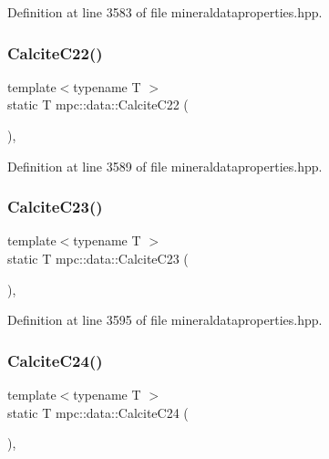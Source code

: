 Definition at line 3583 of file mineraldataproperties.\+hpp.

\mbox{\label{namespacempc_1_1data_a8a6080282f5e9ee5ef7fd6797cf137f4}} 
\subsubsection{\texorpdfstring{Calcite\+C22()}{CalciteC22()}}
{\footnotesize\ttfamily template$<$typename T $>$ \\
static T mpc\+::data\+::\+Calcite\+C22 (\begin{DoxyParamCaption}{ }\end{DoxyParamCaption})\hspace{0.3cm}{\ttfamily [inline]}, {\ttfamily [static]}}



Definition at line 3589 of file mineraldataproperties.\+hpp.

\mbox{\label{namespacempc_1_1data_a235390ea020759b17d1277dd49abf30b}} 
\subsubsection{\texorpdfstring{Calcite\+C23()}{CalciteC23()}}
{\footnotesize\ttfamily template$<$typename T $>$ \\
static T mpc\+::data\+::\+Calcite\+C23 (\begin{DoxyParamCaption}{ }\end{DoxyParamCaption})\hspace{0.3cm}{\ttfamily [inline]}, {\ttfamily [static]}}



Definition at line 3595 of file mineraldataproperties.\+hpp.

\mbox{\label{namespacempc_1_1data_a3e353500a1f0d816709880721b6204de}} 
\subsubsection{\texorpdfstring{Calcite\+C24()}{CalciteC24()}}
{\footnotesize\ttfamily template$<$typename T $>$ \\
static T mpc\+::data\+::\+Calcite\+C24 (\begin{DoxyParamCaption}{ }\end{DoxyParamCaption})\hspace{0.3cm}{\ttfamily [inline]}, {\ttfamily [static]}}



